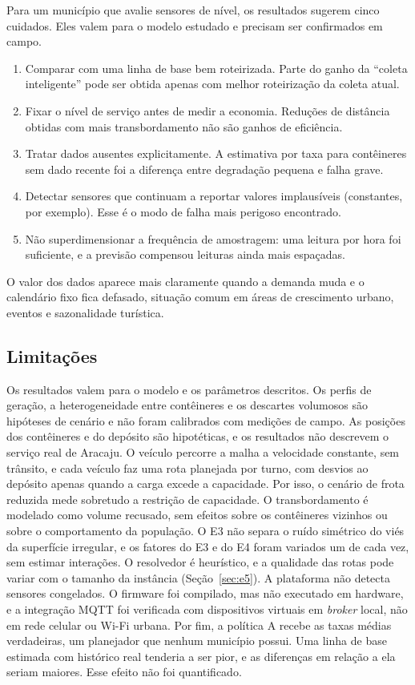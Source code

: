 Para um município que avalie sensores de nível, os resultados sugerem cinco
cuidados. Eles valem para o modelo estudado e precisam ser confirmados em
campo.
\begin{enumerate}
  \item Comparar com uma linha de base bem roteirizada. Parte do ganho da
        ``coleta inteligente'' pode ser obtida apenas com melhor roteirização
        da coleta atual.
  \item Fixar o nível de serviço antes de medir a economia. Reduções de
        distância obtidas com mais transbordamento não são ganhos de
        eficiência.
  \item Tratar dados ausentes explicitamente. A estimativa por taxa para
        contêineres sem dado recente foi a diferença entre degradação
        pequena e falha grave.
  \item Detectar sensores que continuam a reportar valores implausíveis
        (constantes, por exemplo). Esse é o modo de falha mais perigoso
        encontrado.
  \item Não superdimensionar a frequência de amostragem: uma leitura por hora
        foi suficiente, e a previsão compensou leituras ainda mais
        espaçadas.
\end{enumerate}
O valor dos dados aparece mais claramente quando a demanda muda e o calendário
fixo fica defasado, situação comum em áreas de crescimento urbano, eventos e
sazonalidade turística.

\subsection{Limitações}\label{sec:limitacoes}

Os resultados valem para o modelo e os parâmetros descritos. Os perfis de
geração, a heterogeneidade entre contêineres e os descartes volumosos são
hipóteses de cenário e não foram calibrados com medições de campo. As
posições dos contêineres e do depósito são hipotéticas, e os resultados não
descrevem o serviço real de Aracaju. O veículo percorre a malha a velocidade
constante, sem trânsito, e cada veículo faz uma rota planejada por turno, com
desvios ao depósito apenas quando a carga excede a capacidade. Por isso, o
cenário de frota reduzida mede sobretudo a restrição de capacidade. O
transbordamento é modelado como volume recusado, sem efeitos sobre os
contêineres vizinhos ou sobre o comportamento da população. O E3 não separa o
ruído simétrico do viés da superfície irregular, e os fatores do E3 e do E4
foram variados um de cada vez, sem estimar interações. O resolvedor é
heurístico, e a qualidade das rotas pode variar com o tamanho da instância
(Seção~\ref{sec:e5}). A plataforma não detecta sensores congelados. O
firmware foi compilado, mas não executado em hardware, e a integração MQTT
foi verificada com dispositivos virtuais em \emph{broker} local, não em rede
celular ou Wi-Fi urbana. Por fim, a política A recebe as taxas médias
verdadeiras, um planejador que nenhum município possui. Uma linha de base
estimada com histórico real tenderia a ser pior, e as diferenças em relação a
ela seriam maiores. Esse efeito não foi quantificado.
